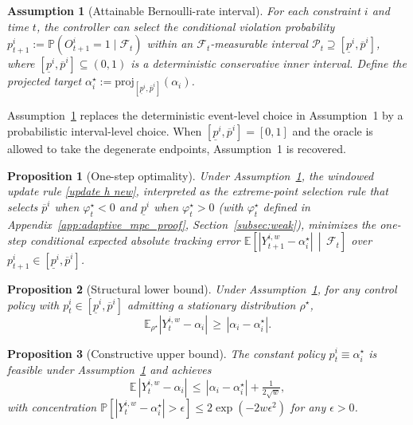 \documentclass[a4paper,fleqn]{cas-dc}
\theoremstyle{plain}
\newtheorem{proposition}{Proposition}
\newtheorem{assumption}{Assumption}
\theoremstyle{remark}
\theoremstyle{plain}
\begin{document}
\begin{assumption}[Attainable Bernoulli-rate interval]\label{asm:attain}
For each constraint $i$ and time $t$, the controller can select the conditional violation probability
$p_{t+1}^i := \mathbb{P}(O_{t+1}^i=1\mid \mathcal{F}_t)$ within an $\mathcal{F}_t$-measurable interval
$\mathcal{P}_t \supseteq [\underline p^i,\overline p^i]$, where $[\underline p^i,\overline p^i]\subseteq(0,1)$ is a deterministic conservative inner interval. Define the projected target
$\alpha_i^\star := \mathrm{proj}_{[\underline p^i,\overline p^i]}(\alpha_i)$.
\end{assumption}

Assumption~\ref{asm:attain} replaces the deterministic event-level choice in Assumption~1 by a probabilistic interval-level choice. When $[\underline p^i,\overline p^i]=[0,1]$ and the oracle is allowed to take the degenerate endpoints, Assumption~1 is recovered.

\begin{proposition}[One-step optimality]\label{prop:onestep}
Under Assumption~\ref{asm:attain}, the windowed update rule \eqref{update h new}, interpreted as the extreme-point selection rule that selects $\overline p^i$ when $\varphi_t^\star<0$ and $\underline p^i$ when $\varphi_t^\star>0$ (with $\varphi_t^\star$ defined in Appendix~\ref{app:adaptive_mpc_proof}, Section~\ref{subsec:weak}), minimizes the one-step conditional expected absolute tracking error $\mathbb{E}\!\left[|Y_{t+1}^{i,w}-\alpha_i^\star|\,\middle|\,\mathcal{F}_t\right]$ over $p_{t+1}^i\in[\underline p^i,\overline p^i]$.
\end{proposition}

\begin{proposition}[Structural lower bound]\label{prop:lower}
Under Assumption~\ref{asm:attain}, for any control policy with $p_t^i\in[\underline p^i,\overline p^i]$ admitting a stationary distribution $\rho^\star$,
\begin{equation}\label{eq:lower-bound}
\mathbb{E}_{\rho^\star}|Y_t^{i,w}-\alpha_i|\,\ge\,|\alpha_i-\alpha_i^\star|.
\end{equation}
\end{proposition}

\begin{proposition}[Constructive upper bound]\label{prop:upper}
The constant policy $p_t^i\equiv\alpha_i^\star$ is feasible under Assumption~\ref{asm:attain} and achieves
\begin{equation}\label{eq:upper-bound}
\mathbb{E}\,|Y_t^{i,w}-\alpha_i|\,\le\,|\alpha_i-\alpha_i^\star|+\tfrac{1}{2\sqrt{w}},
\end{equation}
with concentration $\mathbb{P}\!\left[|Y_t^{i,w}-\alpha_i^\star|>\epsilon\right]\le 2\exp(-2w\epsilon^2)$ for any $\epsilon>0$.
\end{proposition}
\end{document}
